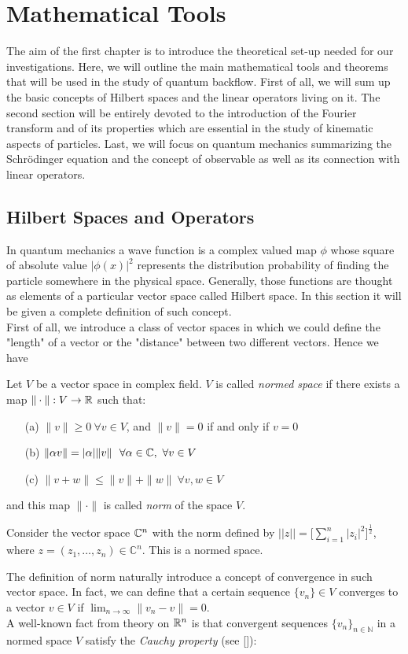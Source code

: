 \chapter{Mathematical Tools}
\label{chapter1}

The aim of the first chapter is to introduce the theoretical set-up needed for our investigations. Here, we will outline the main mathematical tools and theorems that will be used in the study of quantum backflow. First of all, we will sum up the basic concepts of Hilbert spaces and the linear operators living on it. The second section will be entirely devoted to the introduction of the Fourier transform and of its properties which are essential in the study of kinematic aspects of particles. Last, we will focus on quantum mechanics summarizing the Schr\"{o}dinger equation and the concept of observable as well as its connection with linear operators. 

\section{Hilbert Spaces and Operators}

In quantum mechanics a wave function is a complex valued map $\phi$ whose square of absolute value $|\phi(x)|^2$ represents the distribution probability of finding the particle somewhere in the physical space. Generally, those functions are thought as elements of a particular vector space called Hilbert space. In this section it will be given a complete definition of such concept.\\


First of all, we introduce a class of vector spaces in which we could define the "length" of a vector or the "distance" between two different vectors. Hence we have
\begin{definition}	
	Let $V$ be a vector space in complex field. $V$ is called \textit{normed space} if there exists a map $\|\cdot\|:V\to{\mathbb R}$ such that:
	\begin{itemize}
		\item[(a)] $\|v\|\ge0\ \forall v\in V$, and $\|v\|=0$ if and only if $v=0$
		\item[(b)] $\|\alpha v\|=|\alpha|\|v\|\ \ \forall\alpha\in\mC,\ \forall v\in V$
		\item[(c)] $\|v+w\|\le\|v\|+\|w\|\ \forall v,w\in V$
	\end{itemize}
	and this map $\|\cdot\|$ is called \textit{norm} of the space $V$.
\end{definition}
\begin{example}
	Consider the vector space ${\mathbb C}^n$ with the norm defined by
$||z||=\bigg[\sum_{i=1}^n|z_i|^2\bigg]^{\frac{1}{2}}$, where $z=(z_1,\ldots,z_n)\in\mathbb{C}^n$. This is a normed space. 
\end{example}
The definition of norm naturally introduce a concept of convergence in such vector space. In fact, we can define that a certain sequence $\{v_n\}\in V$ converges to a vector $v\in V$ if $\lim_{n\to\infty}\|v_n-v\|=0$.\\
A well-known fact from theory on ${\mathbb R}^n$ is that convergent sequences $\{v_n\}_{n\in\mathbb{N}}$ in a normed space $V$ satisfy the \textit{Cauchy property} (see [\citealp[Chap. 2]{more}]):

